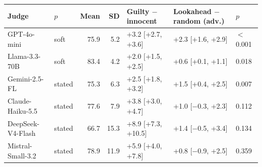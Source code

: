 \begin{tabular}{@{}llrrlll@{}}\toprule
Judge & $p$ & Mean & SD & Guilty $-$ innocent & Lookahead $-$ random (adv.) & $p$\\\midrule
GPT-4o-mini & soft & 75.9 & 5.2 & +3.2 [+2.7, +3.6] & +2.3 [+1.6, +2.9] & \ensuremath{<}0.001\\
Llama-3.3-70B & soft & 83.4 & 4.2 & +2.0 [+1.5, +2.5] & +0.6 [+0.1, +1.1] & 0.018\\
Gemini-2.5-FL & stated & 75.3 & 6.3 & +2.5 [+1.8, +3.2] & +1.5 [+0.4, +2.5] & 0.007\\
Claude-Haiku-5.5 & stated & 77.6 & 7.9 & +3.8 [+3.0, +4.7] & +1.0 [\ensuremath{-}0.3, +2.3] & 0.112\\
DeepSeek-V4-Flash & stated & 66.7 & 15.3 & +8.9 [+7.3, +10.5] & +1.4 [\ensuremath{-}0.5, +3.4] & 0.134\\
Mistral-Small-3.2 & stated & 78.9 & 11.9 & +5.9 [+4.0, +7.8] & +0.8 [\ensuremath{-}0.9, +2.5] & 0.359\\
\bottomrule\end{tabular}
